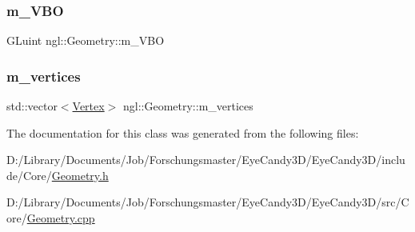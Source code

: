 \subsubsection{\texorpdfstring{m\+\_\+\+V\+BO}{m\_VBO}}
{\footnotesize\ttfamily G\+Luint ngl\+::\+Geometry\+::m\+\_\+\+V\+BO\hspace{0.3cm}{\ttfamily [protected]}}

\mbox{\label{classngl_1_1_geometry_ac2501fd28e300ecd4aa890da9ca7cff8}} 
\subsubsection{\texorpdfstring{m\+\_\+vertices}{m\_vertices}}
{\footnotesize\ttfamily std\+::vector$<$\mbox{\hyperlink{structngl_1_1_vertex}{Vertex}}$>$ ngl\+::\+Geometry\+::m\+\_\+vertices\hspace{0.3cm}{\ttfamily [protected]}}



The documentation for this class was generated from the following files\+:\begin{DoxyCompactItemize}
\item 
D\+:/\+Library/\+Documents/\+Job/\+Forschungsmaster/\+Eye\+Candy3\+D/\+Eye\+Candy3\+D/include/\+Core/\mbox{\hyperlink{_geometry_8h}{Geometry.\+h}}\item 
D\+:/\+Library/\+Documents/\+Job/\+Forschungsmaster/\+Eye\+Candy3\+D/\+Eye\+Candy3\+D/src/\+Core/\mbox{\hyperlink{_geometry_8cpp}{Geometry.\+cpp}}\end{DoxyCompactItemize}
